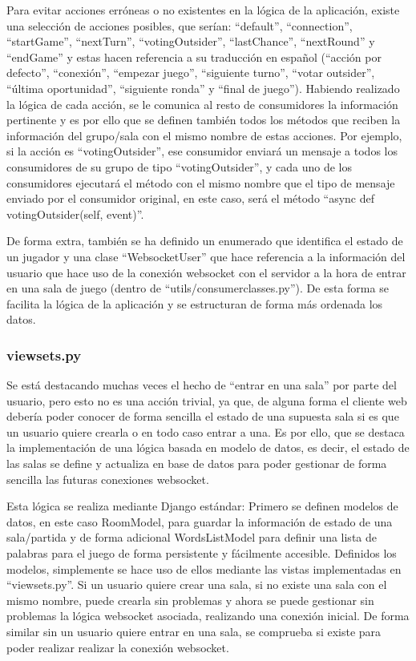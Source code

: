 Para evitar acciones erróneas o no existentes en la lógica de la aplicación, existe una selección de acciones posibles, que serían: ``default'', ``connection'', 
``startGame'', ``nextTurn'', ``votingOutsider'', ``lastChance'', ``nextRound'' y ``endGame'' y estas hacen referencia a su traducción en español (``acción por defecto'', ``conexión'', 
``empezar juego'', ``siguiente turno'', ``votar outsider'', ``última oportunidad'', ``siguiente ronda'' y ``final de juego''). Habiendo realizado la lógica de cada
acción, se le comunica al resto de consumidores la información pertinente y es por ello que se definen también todos los métodos que reciben la información
del grupo/sala con el mismo nombre de estas acciones. Por ejemplo, si la acción es ``votingOutsider'', ese consumidor enviará un mensaje a todos los consumidores 
de su grupo de tipo ``votingOutsider'', y cada uno de los consumidores ejecutará el método con el mismo nombre que el tipo de mensaje enviado por el consumidor original,
en este caso, será el método ``async def votingOutsider(self, event)''.

De forma extra, también se ha definido un enumerado que identifica el estado de un jugador y una clase ``WebsocketUser'' que hace referencia a la información del usuario
que hace uso de la conexión websocket con el servidor a la hora de entrar en una sala de juego (dentro de ``utils/consumer\textunderscore classes.py''). De esta forma se 
facilita la lógica de la aplicación y se estructuran de forma más ordenada los datos.

\subsubsection{viewsets.py}
Se está destacando muchas veces el hecho de ``entrar en una sala'' por parte del usuario, pero esto no es una acción trivial, ya que, de alguna forma
el cliente web debería poder conocer de forma sencilla el estado de una supuesta sala si es que un usuario quiere crearla o en todo caso entrar a una. Es por ello, que se destaca la implementación
de una lógica basada en modelo de datos, es decir, el estado de las salas se define y actualiza en base de datos para poder gestionar de forma sencilla las futuras conexiones websocket.

Esta lógica se realiza mediante Django estándar: Primero se definen modelos de datos, en este caso RoomModel, para guardar la información de estado de una sala/partida
y de forma adicional WordsListModel para definir una lista de palabras para el juego de forma persistente y fácilmente accesible. Definidos los modelos, simplemente se hace uso de ellos mediante
las vistas implementadas en ``viewsets.py''. Si un usuario quiere crear una sala, si no existe una sala con el mismo nombre, puede crearla sin problemas y ahora se puede gestionar sin problemas
la lógica websocket asociada, realizando una conexión inicial. De forma similar sin un usuario quiere entrar en una sala, se comprueba si existe para poder realizar realizar la conexión websocket.

